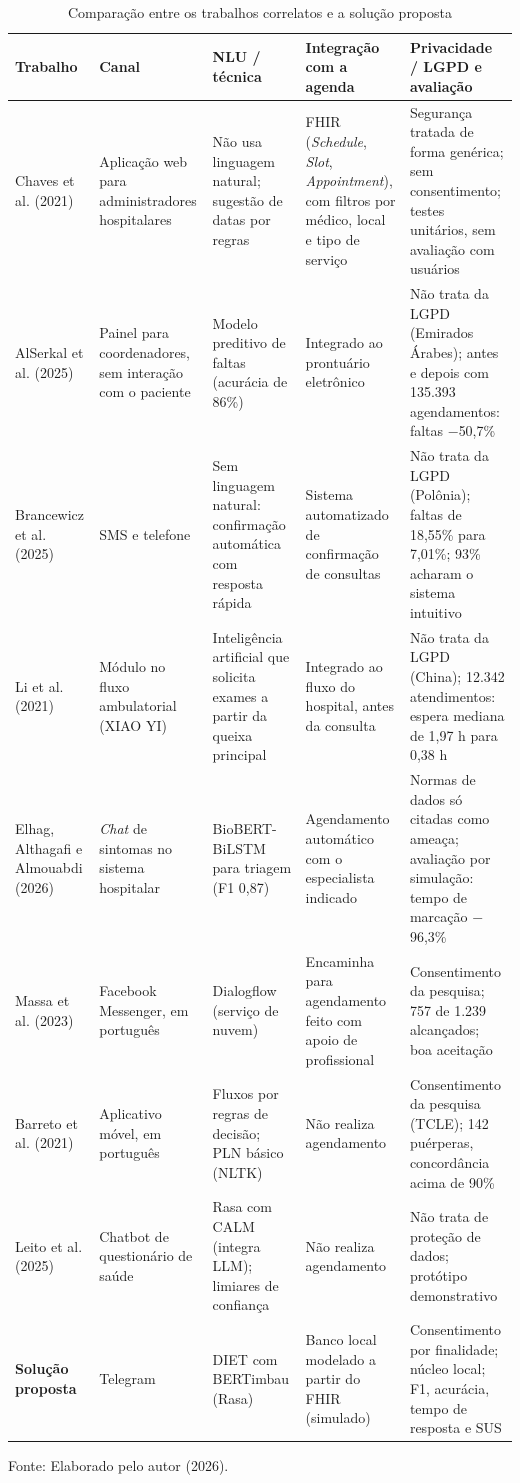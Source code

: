 \documentclass[12pt,a4paper]{extarticle}
\begin{document}
\begin{table}[H]
\centering
\scriptsize
\caption{Comparação entre os trabalhos correlatos e a solução proposta}
\label{tab:correlatos}
\begin{tabularx}{\textwidth}{L{2.4cm}L{2.5cm}L{2.8cm}L{2.8cm}Y}
\hline
\textbf{Trabalho} & \textbf{Canal} & \textbf{NLU / técnica} & \textbf{Integração com a agenda} & \textbf{Privacidade / LGPD e avaliação} \\
\hline
Chaves et al. (2021) & Aplicação web para administradores hospitalares & Não usa linguagem natural; sugestão de datas por regras & FHIR (\textit{Schedule}, \textit{Slot}, \textit{Appointment}), com filtros por médico, local e tipo de serviço & Segurança tratada de forma genérica; sem consentimento; testes unitários, sem avaliação com usuários \\
AlSerkal et al. (2025) & Painel para coordenadores, sem interação com o paciente & Modelo preditivo de faltas (acurácia de 86\%) & Integrado ao prontuário eletrônico & Não trata da LGPD (Emirados Árabes); antes e depois com 135.393 agendamentos: faltas $-$50,7\% \\
Brancewicz et al. (2025) & SMS e telefone & Sem linguagem natural: confirmação automática com resposta rápida & Sistema automatizado de confirmação de consultas & Não trata da LGPD (Polônia); faltas de 18,55\% para 7,01\%; 93\% acharam o sistema intuitivo \\
Li et al. (2021) & Módulo no fluxo ambulatorial (XIAO YI) & Inteligência artificial que solicita exames a partir da queixa principal & Integrado ao fluxo do hospital, antes da consulta & Não trata da LGPD (China); 12.342 atendimentos: espera mediana de 1,97 h para 0,38 h \\
Elhag, Althagafi e Almouabdi (2026) & \textit{Chat} de sintomas no sistema hospitalar & BioBERT-BiLSTM para triagem (F1 0,87) & Agendamento automático com o especialista indicado & Normas de dados só citadas como ameaça; avaliação por simulação: tempo de marcação $-$96,3\% \\
Massa et al. (2023) & Facebook Messenger, em português & Dialogflow (serviço de nuvem) & Encaminha para agendamento feito com apoio de profissional & Consentimento da pesquisa; 757 de 1.239 alcançados; boa aceitação \\
Barreto et al. (2021) & Aplicativo móvel, em português & Fluxos por regras de decisão; PLN básico (NLTK) & Não realiza agendamento & Consentimento da pesquisa (TCLE); 142 puérperas, concordância acima de 90\% \\
Leito et al. (2025) & Chatbot de questionário de saúde & Rasa com CALM (integra LLM); limiares de confiança & Não realiza agendamento & Não trata de proteção de dados; protótipo demonstrativo \\
\textbf{Solução proposta} & Telegram & DIET com BERTimbau (Rasa) & Banco local modelado a partir do FHIR (simulado) & Consentimento por finalidade; núcleo local; F1, acurácia, tempo de resposta e SUS \\
\hline
\end{tabularx}
\vspace{0.3cm}

\footnotesize{Fonte: Elaborado pelo autor (2026).}
\end{table}
\end{document}
